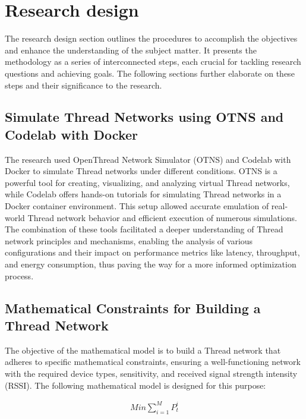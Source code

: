 \chapter{Research design}\label{chap:research}

The research design section outlines the procedures to accomplish the objectives and enhance the understanding of the subject matter. It presents the methodology as a series of interconnected steps, each crucial for tackling research questions and achieving goals. The following sections further elaborate on these steps and their significance to the research.


\section{Simulate Thread Networks using OTNS and Codelab with Docker}\label{sec:simulation}
The research used OpenThread Network Simulator (OTNS) and Codelab with Docker to simulate Thread networks under different conditions. OTNS is a powerful tool for creating, visualizing, and analyzing virtual Thread networks, while Codelab offers hands-on tutorials for simulating Thread networks in a Docker container environment. This setup allowed accurate emulation of real-world Thread network behavior and efficient execution of numerous simulations. The combination of these tools facilitated a deeper understanding of Thread network principles and mechanisms, enabling the analysis of various configurations and their impact on performance metrics like latency, throughput, and energy consumption, thus paving the way for a more informed optimization process.

\section{Mathematical Constraints for Building a Thread Network}\label{sec:mathematical_constraints}
The objective of the mathematical model is to build a Thread network that adheres to specific mathematical constraints, ensuring a well-functioning network with the required device types, sensitivity, and received signal strength intensity (RSSI). The following mathematical model is designed for this purpose:

\begin{equation}\label{eq:minimize_power}
    \begin{aligned}
        Min\sum_{i=1}^{M}P_t^i
    \end{aligned}
\end{equation}

